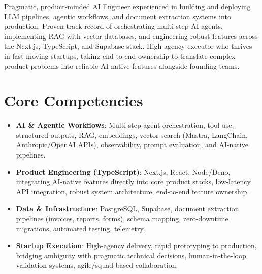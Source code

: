 \documentclass[10pt,a4paper,sans]{moderncv}
\begin{document}
\makecvtitle
\vspace{-12pt}

\small{Pragmatic, product-minded AI Engineer experienced in building and deploying LLM pipelines, agentic workflows, and document extraction systems into production. Proven track record of orchestrating multi-step AI agents, implementing RAG with vector databases, and engineering robust features across the Next.js, TypeScript, and Supabase stack. High-agency executor who thrives in fast-moving startups, taking end-to-end ownership to translate complex product problems into reliable AI-native features alongside founding teams.}
\vspace{2pt}

\section{Core Competencies}
\vspace{1pt}
\begin{itemize}
\item \textbf{AI \& Agentic Workflows}: Multi-step agent orchestration, tool use, structured outputs, RAG, embeddings, vector search (Mastra, LangChain, Anthropic/OpenAI APIs), observability, prompt evaluation, and AI-native pipelines.
\item \textbf{Product Engineering (TypeScript)}: Next.js, React, Node/Deno, integrating AI-native features directly into core product stacks, low-latency API integration, robust system architecture, end-to-end feature ownership.
\item \textbf{Data \& Infrastructure}: PostgreSQL, Supabase, document extraction pipelines (invoices, reports, forms), schema mapping, zero-downtime migrations, automated testing, telemetry.
\item \textbf{Startup Execution}: High-agency delivery, rapid prototyping to production, bridging ambiguity with pragmatic technical decisions, human-in-the-loop validation systems, agile/squad-based collaboration.
\end{itemize}
\vspace{3pt}

\end{document}
